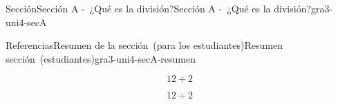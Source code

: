 \documentclass[oneside,10pt,]{article}
\begin{document}
\begin{sectionptx}{Sección}{Sección A -~¿Qué es la división?}{}{Sección A -~¿Qué es la división?}{}{}{gra3-uni4-secA}
\begin{references-subsection}{Referencias}{Resumen de la sección~(para los estudiantes)}{}{Resumen sección~(estudiantes)}{}{}{gra3-uni4-secA-resumen}
\begin{sidebyside}{2}{0.025}{0.025}{0.05}
\begin{sbspanel}{0.45}
\end{sbspanel}%
\end{sidebyside}%
\begin{sidebyside}{2}{0.025}{0.025}{0.05}%
\begin{sbspanel}{0.45}%
%
\begin{equation*}
12 \div 2
\end{equation*}
%
\end{sbspanel}%
\begin{sbspanel}{0.45}%
\par
%
\begin{equation*}
12 \div 2
\end{equation*}
%
\end{sbspanel}%
\end{sidebyside}%
\end{references-subsection}
\end{sectionptx}
%
%
\typeout{************************************************}
\typeout{************************************************}
%
\end{document}
